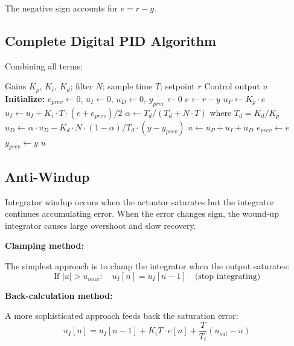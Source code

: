 The negative sign accounts for $e = r - y$.

\subsection{Complete Digital PID Algorithm}

Combining all terms:

\begin{algorithm}[htbp]
\caption{Digital PID Controller with Derivative Filter}
\label{alg:digital_pid}
\begin{algorithmic}[1]
\REQUIRE Gains $K_p$, $K_i$, $K_d$; filter $N$; sample time $T$; setpoint $r$
\ENSURE Control output $u$
\STATE \textbf{Initialize:} $e_{prev} \gets 0$, $u_I \gets 0$, $u_D \gets 0$, $y_{prev} \gets 0$
\STATE {}
\STATE $e \gets r - y$ 
\STATE $u_P \gets K_p \cdot e$ 
\STATE $u_I \gets u_I + K_i \cdot T \cdot (e + e_{prev})/2$ 
\STATE $\alpha \gets T_d / (T_d + N \cdot T)$ where $T_d = K_d/K_p$
\STATE $u_D \gets \alpha \cdot u_D - K_d \cdot N \cdot (1-\alpha)/T_d \cdot (y - y_{prev})$ 
\STATE $u \gets u_P + u_I + u_D$ 
\STATE $e_{prev} \gets e$ 
\STATE $y_{prev} \gets y$
\RETURN $u$
\end{algorithmic}
\end{algorithm}

\subsection{Anti-Windup}

Integrator windup occurs when the actuator saturates but the integrator continues accumulating error. When the error changes sign, the wound-up integrator causes large overshoot and slow recovery.

\textbf{Clamping method:}

The simplest approach is to clamp the integrator when the output saturates:
\begin{equation}
\text{If } |u| > u_{max}: \quad u_I[n] = u_I[n-1] \quad \text{(stop integrating)}
\end{equation}

\textbf{Back-calculation method:}

A more sophisticated approach feeds back the saturation error:
\begin{equation}
u_I[n] = u_I[n-1] + K_i T \cdot e[n] + \frac{T}{T_t}(u_{sat} - u)
\end{equation}

